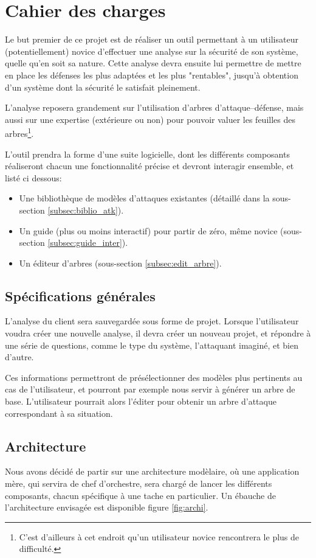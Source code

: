 \section{Cahier des charges}
    Le but premier de ce projet est de réaliser un outil permettant à un utilisateur (potentiellement) novice d'effectuer une analyse sur la sécurité de son système, quelle qu'en soit sa nature. Cette analyse devra ensuite lui permettre de mettre en place les défenses les plus adaptées et les plus "rentables", jusqu'à obtention d'un système dont la sécurité le satisfait pleinement.
    
    L'analyse reposera grandement sur l'utilisation d'arbres d'attaque--défense, mais aussi sur une expertise (extérieure ou non) pour pouvoir valuer les feuilles des arbres\footnote{C'est d'ailleurs à cet endroit qu'un utilisateur novice rencontrera le plus de difficulté.}.
    
    L'outil prendra la forme d'une suite logicielle, dont les différents composants réaliseront chacun une fonctionnalité précise et devront interagir ensemble, et listé ci dessous:
    \begin{itemize}
    	\item Une bibliothèque de modèles d'attaques existantes (détaillé dans la sous-section \ref{subsec:biblio_atk}).
        \item Un guide (plus ou moins interactif) pour partir de zéro, même novice (sous-section \ref{subsec:guide_inter}).
        \item Un éditeur d'arbres (sous-section \ref{subsec:edit_arbre}).
    \end{itemize}

    \subsection{Spécifications générales}
        \label{subsec:spec_gen}
        L'analyse du client sera sauvegardée sous forme de projet. Lorsque l'utilisateur voudra créer une nouvelle analyse, il devra créer un nouveau projet, et répondre à une série de questions, comme le type du système, l'attaquant imaginé, et bien d'autre.
        
        Ces informations permettront de présélectionner des modèles plus pertinents au cas de l'utilisateur, et pourront par exemple nous servir à générer un arbre de base. L'utilisateur pourrait alors l'éditer pour obtenir un arbre d'attaque correspondant à sa situation.
    
    \subsection{Architecture}
        Nous avons décidé de partir sur une architecture modèlaire, où une application mère, qui servira de chef d'orchestre, sera chargé de lancer les différents composants, chacun spécifique à une tache en particulier. %
        Un ébauche de l'architecture envisagée est disponible figure \ref{fig:archi}.

